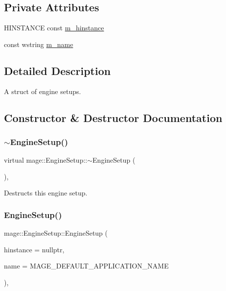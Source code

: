 \subsection*{Private Attributes}
\begin{DoxyCompactItemize}
\item 
H\+I\+N\+S\+T\+A\+N\+CE const \hyperlink{structmage_1_1_engine_setup_a8d2dc7d0e8ec66629d8f6238a89bbb48}{m\+\_\+hinstance}
\item 
const wstring \hyperlink{structmage_1_1_engine_setup_a40fba981d4b1c30eff304b029a013009}{m\+\_\+name}
\end{DoxyCompactItemize}


\subsection{Detailed Description}
A struct of engine setups. 

\subsection{Constructor \& Destructor Documentation}
\hypertarget{structmage_1_1_engine_setup_a77de1ad7e922dec4791b558d20616b08}{}\label{structmage_1_1_engine_setup_a77de1ad7e922dec4791b558d20616b08} 
\subsubsection{\texorpdfstring{$\sim$\+Engine\+Setup()}{~EngineSetup()}}
{\footnotesize\ttfamily virtual mage\+::\+Engine\+Setup\+::$\sim$\+Engine\+Setup (\begin{DoxyParamCaption}{ }\end{DoxyParamCaption})\hspace{0.3cm}{\ttfamily [virtual]}, {\ttfamily [default]}}

Destructs this engine setup. \hypertarget{structmage_1_1_engine_setup_a5a19cf91bfd8cea940abbbbbdd1828a1}{}\label{structmage_1_1_engine_setup_a5a19cf91bfd8cea940abbbbbdd1828a1} 
\subsubsection{\texorpdfstring{Engine\+Setup()}{EngineSetup()}\hspace{0.1cm}{\footnotesize\ttfamily [1/3]}}
{\footnotesize\ttfamily mage\+::\+Engine\+Setup\+::\+Engine\+Setup (\begin{DoxyParamCaption}\item[{H\+I\+N\+S\+T\+A\+N\+CE}]{hinstance = {\ttfamily nullptr},  }\item[{const wstring \&}]{name = {\ttfamily MAGE\+\_\+DEFAULT\+\_\+APPLICATION\+\_\+NAME} }\end{DoxyParamCaption})\hspace{0.3cm}{\ttfamily [explicit]}, {\ttfamily [protected]}}

